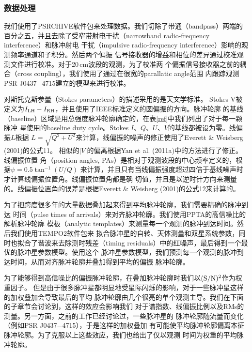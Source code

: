 \subsubsection{数据处理}

我们使用了PSRCHIVE软件包来处理数据\supercite{Hotan04}。我们切除了带通（bandpass）两端的
百分之五，并且去除了受窄带射电干扰（narrowband radio-frequency interference）和脉冲射电
干扰（impulsive radio-frequency interference）影响的观测频率通道和子积分。然后两个偏振
信号接收器的增益和相位的差异通过校准观测文件进行校准。对于20\,cm波段的观测，为了校准两
个偏振信号接收器之前的耦合（cross coupling），我们使用了通过在很宽的parallatic angle范围
内跟踪观测PSR J0437$-$4715建立的模型来进行校准\supercite{VanStraten04}。

对斯托克斯参量（Stokes parameters）的描述采用的是天文学标准\supercite{VanStraten10}。
Stokes V被定义为$I_{\rm{LH}}-I_{\rm{RH}}$，并且使用了IEEE标准定义的圆偏振的方向。脉冲轮廓
的基线（baseline）区域是用总强度脉冲轮廓确定的，在表\ref{ref}中我们列出了对于每一颗脉冲
星使用的baseline duty cycle。Stokes $I$、$Q$、$U$、$V$的基线都被设为零。线偏振$L$根据
$L=\sqrt{Q^2+U^2}$来计算，线偏振的噪声的修正使用了Everett \& Weisberg (2001)\supercite{Everett01}的公式11。
相似的$|V|$的偏离根据Yan et al. (2011a)\supercite{Yan11a}中的方法进行了修正。线偏振位置
角（position angles, PAs）是相对于观测波段的中心频率定义的，根据$\psi=0.5\tan^{-1}(U/Q)$
来计算，并且只有当线偏振强度超过四倍于基线噪声时才计算线偏振位置角。线偏振位置角都是确
切值，并且是以逆时针方向来测量的。线偏振位置角的误差是根据Everett \& Weisberg (2001)\supercite{Everett01}的公式12来计算的。

为了把跨度很多年的大量数据叠加起来得到平均脉冲轮廓，我们需要精确的脉冲到达
时间（pulse times of arrivals）来对齐脉冲轮廓。我们使用PPTA的高信噪比的解析脉冲轮廓
模板（analytic templates）来测量每一个观测的脉冲到达时间。然后我们使用TEMPO2软件包来
拟合脉冲星的自转、天体测量和双星系统参数，同时也拟合了谐波来去除测时残差（timing 
residuals）中的红噪声\supercite{Hobbs06}，最后得到一个最优的脉冲星参数模型。使用这个
脉冲星参数模型，我们预测每一个观测的脉冲到达时间，从而对齐脉冲轮廓并叠加得到平均的偏振
脉冲轮廓。

为了能够得到高信噪比的偏振脉冲轮廓，在叠加脉冲轮廓时我们以$(\rm{S/N})^2$作为权重因子。
但是由于很多脉冲星都明显地受星际闪烁的影响，对于一些脉冲星这样的加权叠加会导致最后的平均
脉冲轮廓由几个很亮的单个观测主导。我们在下面的子章节会讨论到，这样的效应会影响我们
对于谱指数、线偏振比例以及RMs的测量。另一方面，之前的工作已经讨论过，一些脉冲星的
脉冲轮廓随流量而变化（例如PSR J0437$-$4715）\supercite{Oslowski14}，于是这样的加权叠加
有可能使平均脉冲轮廓偏离本征脉冲轮廓。为了克服以上这些效应，我们也给出了仅以观测
时间为权重的平均脉冲轮廓。

